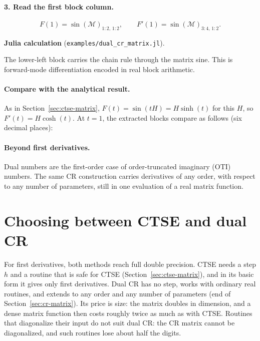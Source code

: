 \documentclass[11pt]{article}
\newcommand{\juliascript}[1]{\par\medskip\needspace{6\baselineskip}\noindent
  \textbf{Julia calculation} (\nolinkurl{examples/#1}).\par
  }
\begin{document}
\paragraph{3. Read the first block column.}
\[
 \boxed{F(1)=\sin(\mathcal M)_{1:2,\,1:2},\qquad
 F'(1)=\sin(\mathcal M)_{3:4,\,1:2}.}
\]
\juliascript{dual_cr_matrix.jl}
The lower-left block carries the chain rule through the matrix sine.
This is forward-mode differentiation encoded in real block arithmetic.

\paragraph{Compare with the analytical result.}
As in Section~\ref{sec:ctse-matrix}, $F(t)=\sin(tH)=H\sinh(t)$ for this $H$,
so $F'(t)=H\cosh(t)$. At $t=1$, the extracted blocks compare as follows
(six decimal places):
%

\paragraph{Beyond first derivatives.}
Dual numbers are the first-order case of order-truncated imaginary (OTI)
numbers. The same CR construction carries derivatives of any order, with
respect to any number of parameters, still in one evaluation of a real matrix
function.

\section*{Choosing between CTSE and dual CR}
For first derivatives, both methods reach full double precision. CTSE needs a
step $h$ and a routine that is safe for CTSE (Section~\ref{sec:ctse-matrix}),
and in its basic form it gives only first derivatives. Dual CR has no step,
works with ordinary real routines, and extends to any order and any number of
parameters (end of Section~\ref{sec:cr-matrix}). Its price is size: the matrix doubles in dimension,
and a dense matrix function then costs roughly twice as much as with CTSE.
Routines that diagonalize their input do not suit dual CR: the CR matrix
cannot be diagonalized, and such routines lose about half the digits.
\end{document}
